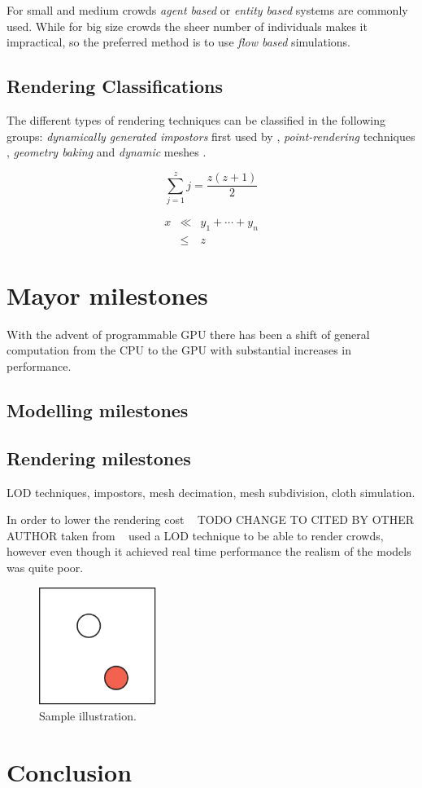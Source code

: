 \documentclass[conference]{acmsiggraph}
\begin{document}
For small and medium crowds \textit{agent based} or \textit{entity based} systems are
commonly used. While for big size crowds the sheer number of individuals
makes it impractical, so the preferred method is to use \textit{flow based}
simulations.

\subsection{Rendering Classifications}

The different types of rendering techniques can be classified in the 
following groups: \textit{dynamically generated impostors} first used by  \cite{Aubel2000}, 
\textit{point-rendering} techniques \cite{Wand2002}, \textit{geometry baking} 
\cite{Ulicny2004} and \textit{dynamic} meshes \cite{Ciechomski2005}.

\begin{equation}
 \sum_{j=1}^{z} j = \frac{z(z+1)}{2}
\end{equation}

\begin{eqnarray}
x & \ll & y_{1} + \cdots + y_{n} \\
  & \leq & z
\end{eqnarray}

\section{Mayor milestones}

With the advent of programmable GPU there has been a shift of
general computation from the CPU to the GPU with substantial
increases in performance.

\subsection{Modelling milestones}

\subsection{Rendering milestones}

 LOD techniques, impostors, mesh decimation,
mesh subdivision, cloth simulation.

In order to lower the rendering cost ~\cite{pratt1997humans} TODO CHANGE TO CITED BY OTHER AUTHOR taken from ~\cite{Aubel1999} used a
LOD technique to be able to render crowds, however even though it 
achieved real time performance the realism of the models was quite
poor.


\begin{figure}[ht]
  \centering
  \includegraphics[width=1.5in]{images/samplefigure}
  \caption{Sample illustration.}
\end{figure}

\section{Conclusion}



\end{document}
